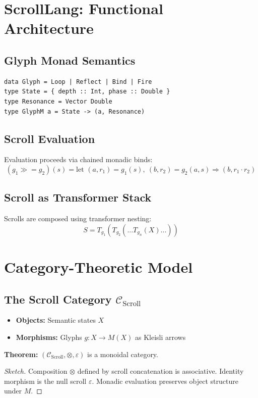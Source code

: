 \documentclass[12]{amsart}
\theoremstyle{plain}
\begin{document}
\section{ScrollLang: Functional Architecture}

\subsection{Glyph Monad Semantics}
\begin{verbatim}
data Glyph = Loop | Reflect | Bind | Fire
type State = { depth :: Int, phase :: Double }
type Resonance = Vector Double
type GlyphM a = State -> (a, Resonance)
\end{verbatim}

\subsection{Scroll Evaluation}
Evaluation proceeds via chained monadic binds:
\[
(g_1 \gg= g_2)(s) = \text{let } (a, r_1) = g_1(s), \ (b, r_2) = g_2(a, s) \Rightarrow (b, r_1 \cdot r_2)
\]

\subsection{Scroll as Transformer Stack}
Scrolls are composed using transformer nesting:
\[
S = T_{g_1}(T_{g_2}(...T_{g_n}(X)...))
\]

\section{Category-Theoretic Model}

\subsection{The Scroll Category \(\mathcal{C}_{\text{Scroll}}\)}

\begin{itemize}
  \item \textbf{Objects:} Semantic states $X$
  \item \textbf{Morphisms:} Glyphs $g: X \to M(X)$ as Kleisli arrows
\end{itemize}

\textbf{Theorem:} $(\mathcal{C}_{\text{Scroll}}, \otimes, \varepsilon)$ is a monoidal category.

\begin{proof}[Sketch]
Composition $\otimes$ defined by scroll concatenation is associative. Identity morphism is the null scroll $\varepsilon$. Monadic evaluation preserves object structure under $M$.
\end{proof}
\end{document}

